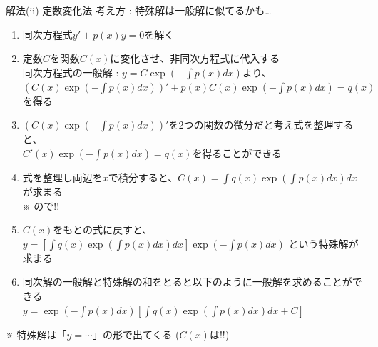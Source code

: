 \documentclass[a4paper]{jsarticle}
\begin{document}
\begin{itembox}[l]{解法(ii) 定数変化法}
    考え方 : 特殊解は一般解に似てるかも\dots
    \begin{enumerate}[(1)]
        \item 同次方程式$y'+p\left(x\right)y=0$を解く
        \item 定数$C$を関数$C\left(x\right)$に変化させ、非同次方程式に代入する\\
              同次方程式の一般解 : $y=C\exp\left(-\int p\left(x\right)dx\right)$より、\\
              $\left(C\left(x\right)\exp\left(-\int p\left(x\right)dx\right)\right)'+p\left(x\right)C\left(x\right)\exp\left(-\int p\left(x\right)dx\right)=q\left(x\right)$を得る
        \item $\left(C\left(x\right)\exp\left(-\int p\left(x\right)dx\right)\right)'$を2つの関数の微分だと考え式を整理すると、\\
              $C'\left(x\right)\exp\left(-\int p\left(x\right)dx\right)=q\left(x\right)$を得ることができる
        \item 式を整理し両辺を$x$で積分すると、$C\left(x\right)=\int q\left(x\right)\exp\left(\int p\left(x\right)dx\right)dx$が求まる\\
              ※ ので!!
        \item $C\left(x\right)$をもとの式に戻すと、$y=\left[\int q\left(x\right)\exp\left(\int p\left(x\right)dx\right)dx\right]\exp\left(-\int p\left(x\right)dx\right)$
              という特殊解が求まる
        \item 同次解の一般解と特殊解の和をとると以下のように一般解を求めることができる\\
              $y=\exp\left(-\int p\left(x\right)dx\right)\left[\int q\left(x\right)\exp\left(\int p\left(x\right)dx\right)dx+C\right]$
    \end{enumerate}
\end{itembox}
※ 特殊解は「$y=\cdots$」の形で出てくる ($C\left(x\right)$は!!)\\
\end{document}
